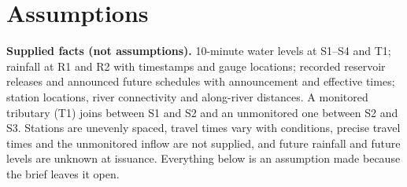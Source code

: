 \section{Assumptions}
\textbf{Supplied facts (not assumptions).} 10-minute water levels at S1--S4 and T1; rainfall at
R1 and R2 with timestamps and gauge locations; recorded reservoir releases and announced future
schedules with announcement and effective times; station locations, river connectivity and
along-river distances. A monitored tributary (T1) joins between S1 and S2 and an unmonitored one
between S2 and S3. Stations are unevenly spaced, travel times vary with conditions, precise
travel times and the unmonitored inflow are not supplied, and future rainfall and future levels are
unknown at issuance. Everything below is an assumption made because the brief leaves it open.

